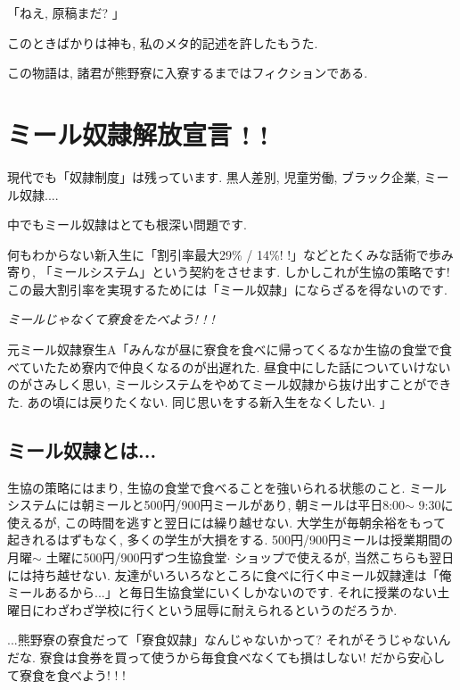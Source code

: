 \documentclass[10pt,b5jsbook,dvips,dvipdfmx,openany]{jsbook}
\theoremstyle{definition}
\begin{document}
	「ねえ, 原稿まだ? 」

	このときばかりは神も, 私のメタ的記述を許したもうた.

	この物語は, 諸君が熊野寮に入寮するまではフィクションである.



	\section{ミール奴隷解放宣言 ! !}

	現代でも「奴隷制度」は残っています. 黒人差別, 児童労働, ブラック企業, ミール奴隷....

	中でもミール奴隷はとても根深い問題です.

	何もわからない新入生に「割引率最大29\% / 14\%! !」などとたくみな話術で歩み寄り, 「ミールシステム」という契約をさせます. しかしこれが生協の策略です! この最大割引率を実現するためには「ミール奴隷」にならざるを得ないのです.

	\emph{\LARGE  ミールじゃなくて寮食をたべよう! ! ! }


	元ミール奴隷寮生A「みんなが昼に寮食を食べに帰ってくるなか生協の食堂で食べていたため寮内で仲良くなるのが出遅れた. 昼食中にした話についていけないのがさみしく思い, ミールシステムをやめてミール奴隷から抜け出すことができた. あの頃には戻りたくない. 同じ思いをする新入生をなくしたい. 」

		\subsection{ミール奴隷とは...}
		生協の策略にはまり, 生協の食堂で食べることを強いられる状態のこと. ミールシステムには朝ミールと500円/900円ミールがあり, 朝ミールは平日8:00$ \sim $ 9:30に使えるが, この時間を逃すと翌日には繰り越せない. 大学生が毎朝余裕をもって起きれるはずもなく, 多くの学生が大損をする. 500円/900円ミールは授業期間の月曜$ \sim $ 土曜に500円/900円ずつ生協食堂$ \cdot $ ショップで使えるが, 当然こちらも翌日には持ち越せない. 友達がいろいろなところに食べに行く中ミール奴隷達は「俺ミールあるから...」と毎日生協食堂にいくしかないのです. それに授業のない土曜日にわざわざ学校に行くという屈辱に耐えられるというのだろうか.

		...熊野寮の寮食だって「寮食奴隷」なんじゃないかって?
それがそうじゃないんだな. 寮食は食券を買って使うから毎食食べなくても損はしない! だから安心して寮食を食べよう! ! !


\end{document}
